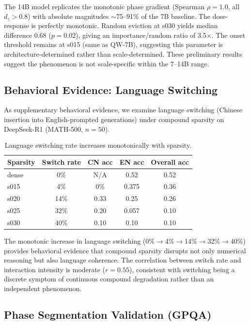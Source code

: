 \documentclass[11pt,a4paper]{article}
\begin{document}
The 14B model replicates the monotonic phase gradient (Spearman $\rho = 1.0$, all $d_z > 0.8$) with absolute magnitudes $\sim$75--91\% of the 7B baseline. The dose-response is perfectly monotonic. Random eviction at s030 yields median difference 0.68 ($p = 0.02$), giving an importance/random ratio of 3.5$\times$. The onset threshold remains at s015 (same as QW-7B), suggesting this parameter is architecture-determined rather than scale-determined. These preliminary results suggest the phenomenon is not scale-specific within the 7--14B range.

\subsection{Behavioral Evidence: Language Switching}
\label{sec:language}

As supplementary behavioral evidence, we examine language switching (Chinese insertion into English-prompted generations) under compound sparsity on DeepSeek-R1 (MATH-500, $n=50$).

\begin{table}[h]
\centering
\caption{Language switching rate increases monotonically with sparsity.}
\label{tab:lang}
\begin{tabular}{lcccc}
\toprule
\textbf{Sparsity} & \textbf{Switch rate} & \textbf{CN acc} & \textbf{EN acc} & \textbf{Overall acc} \\
\midrule
dense & 0\% & N/A & 0.52 & 0.52 \\
s015 & 4\% & 0\% & 0.375 & 0.36 \\
s020 & 14\% & 0.33 & 0.25 & 0.26 \\
s025 & 32\% & 0.20 & 0.057 & 0.10 \\
s030 & 40\% & 0.10 & 0.10 & 0.10 \\
\bottomrule
\end{tabular}
\end{table}

The monotonic increase in language switching (0\%$\to$4\%$\to$14\%$\to$32\%$\to$40\%) provides behavioral evidence that compound sparsity disrupts not only numerical reasoning but also language coherence. The correlation between switch rate and interaction intensity is moderate ($r = 0.55$), consistent with switching being a discrete symptom of continuous compound degradation rather than an independent phenomenon.

\subsection{Phase Segmentation Validation (GPQA)}
\label{sec:validation}
\end{document}
